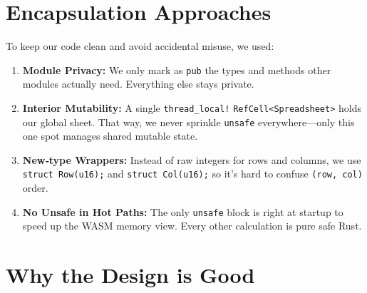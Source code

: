 \documentclass[12pt]{article}
\begin{document}
    \section{Encapsulation Approaches}

    To keep our code clean and avoid accidental misuse, we used:

    \begin{enumerate}
        \item \textbf{Module Privacy:}
        We only mark as \texttt{pub} the types and methods other modules actually need.  Everything else stays private.

        \item \textbf{Interior Mutability:}
        A single \texttt{thread\_local!} \texttt{RefCell<Spreadsheet>} holds our global sheet.  That way, we never sprinkle \texttt{unsafe} everywhere—only this one spot manages shared mutable state.

        \item \textbf{New‐type Wrappers:}
        Instead of raw integers for rows and columns, we use \texttt{struct Row(u16);} and \texttt{struct Col(u16);} so it’s hard to confuse \texttt{(row, col)} order.

        \item \textbf{No Unsafe in Hot Paths:}
        The only \texttt{unsafe} block is right at startup to speed up the WASM memory view.  Every other calculation is pure safe Rust.
    \end{enumerate}

    \section{Why the Design is Good}
\end{document}
